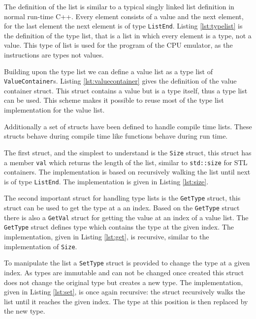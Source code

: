 The definition of the list is similar to a typical singly linked list definition in normal run-time C++. Every
element consists of a value and the next element, for the last element the next element is of type \lstinline{ListEnd}.
Listing \ref{lst:typelist} is the definition of the type list, that is a list in which every element is a type, not
a value. This type of list is used for the program of the CPU emulator, as the instructions are types not values.



Building upon the type list we can define a value list as a type list of \lstinline{ValueContainer}s. Listing
\ref{lst:valuecontainer} gives the definition of the value container struct. This struct contains a value but
is a type itself, thus a type list can be used. This scheme makes it possible to reuse most of the type list
implementation for the value list.



Additionally a set of structs have been defined to handle compile time lists. These structs behave during compile time like 
functions behave during run time. 

The first struct, and the simplest to understand is the \lstinline{Size} struct, this
struct has a member \lstinline{val} which returns the length of the list, similar to 
\lstinline{std::size} for STL containers. The implementation is based on recursively 
walking the list until next is of type \lstinline{ListEnd}. The implementation is given
in Listing \ref{lst:size}.



The second important struct for handling type lists is the \lstinline{GetType} struct,
this struct can be used to get the type at a an index. Based on the \lstinline{GetType}
struct there is also a \lstinline{GetVal} struct for getting the value at an index of
a value list. The \lstinline{GetType} struct defines type which contains the type
at the given index. The implementation, given in Listing \ref{lst:get}, 
is recursive, similar to the implementation of \lstinline{Size}.



To manipulate the list a \lstinline{SetType} struct is provided to change the type at 
a given index. As types are immutable and can not be changed once created this struct
does not change the original type but creates a new type. The implementation, given
in Listing \ref{lst:set}, is once again recursive: 
the struct recursively walks the list until it reaches the given index. The
type at this position is then replaced by the new type. 

